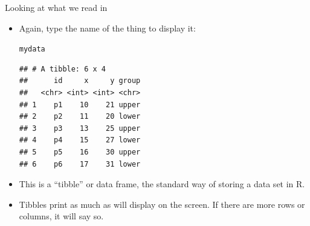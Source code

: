 \documentclass[unknownkeysallowed]{beamer}\usepackage[]{graphicx}\usepackage[]{color}
\makeatletter
\newcommand{\hlstd}[1]{\textcolor[rgb]{0.345,0.345,0.345}{#1}}%
\newenvironment{kframe}{%
 \def\at@end@of@kframe{}%
 \ifinner\ifhmode%
  \def\at@end@of@kframe{\end{minipage}}%
  \begin{minipage}{\columnwidth}%
 \fi\fi%
 \def\FrameCommand##1{\hskip\@totalleftmargin \hskip-\fboxsep
 \colorbox{shadecolor}{##1}\hskip-\fboxsep
     \hskip-\linewidth \hskip-\@totalleftmargin \hskip\columnwidth}%
 \MakeFramed {\advance\hsize-\width
   \@totalleftmargin\z@ \linewidth\hsize
   \@setminipage}}%
 {\par\unskip\endMakeFramed%
 \at@end@of@kframe}
\newenvironment{knitrout}{}{} %
\makeatother
\begin{document}
\begin{frame}[fragile]{Looking at what we read in}
  
  \begin{itemize}
\item Again, type the name of the thing to display it:
  
\begin{knitrout}
\color{fgcolor}\begin{kframe}
\begin{alltt}
\hlstd{mydata}
\end{alltt}
\begin{verbatim}
## # A tibble: 6 x 4
##      id     x     y group
##   <chr> <int> <int> <chr>
## 1    p1    10    21 upper
## 2    p2    11    20 lower
## 3    p3    13    25 upper
## 4    p4    15    27 lower
## 5    p5    16    30 upper
## 6    p6    17    31 lower
\end{verbatim}
\end{kframe}
\end{knitrout}

\item This is a ``tibble'' or data frame, the standard way of storing
  a data set in R.
\item Tibbles print as much as will display on the screen. If there
  are more rows or columns, it will say so.
  \end{itemize}
  
\end{frame}
\end{document}
